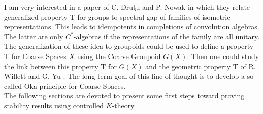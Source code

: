I am very interested in a paper of C. Dru{\c{t}}u and P. Nowak \cite{DrutuNowak} in which they relate generalized property T for groups to spectral gap of families of isometric representations. This leads to idempotents in completions of convolution algebras. The latter are only $C^*$-algebras if the representations of the family are all unitary. The generalization of these idea to groupoids could be used to define a property T for Coarse Spaces $X$ using the Coarse Groupoid $G(X)$. Then one could study the link between this property T for $G(X)$ and the geometric property T of R. Willett and G. Yu \cite{WillettYu}. The long term goal of this line of thought is to develop a so called Oka principle for Coarse Spaces.\\

The following sections are devoted to present some first steps toward proving stability results using controlled $K$-theory. 

      
